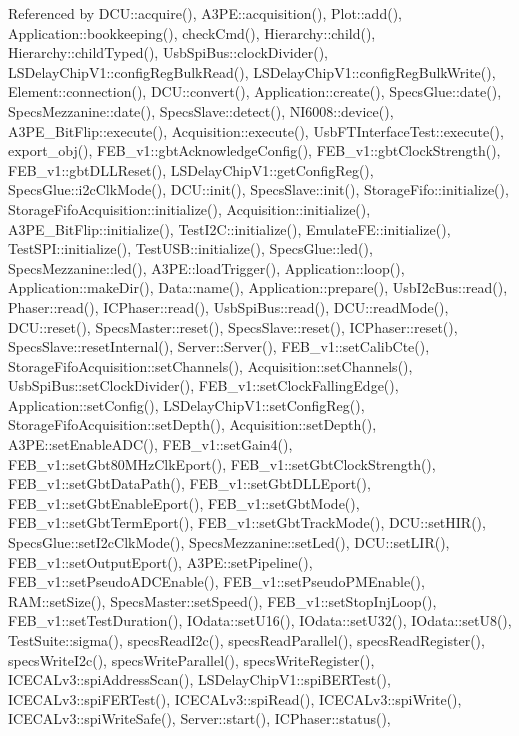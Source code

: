 Referenced by D\+C\+U\+::acquire(), A3\+P\+E\+::acquisition(), Plot\+::add(), Application\+::bookkeeping(), check\+Cmd(), Hierarchy\+::child(), Hierarchy\+::child\+Typed(), Usb\+Spi\+Bus\+::clock\+Divider(), L\+S\+Delay\+Chip\+V1\+::config\+Reg\+Bulk\+Read(), L\+S\+Delay\+Chip\+V1\+::config\+Reg\+Bulk\+Write(), Element\+::connection(), D\+C\+U\+::convert(), Application\+::create(), Specs\+Glue\+::date(), Specs\+Mezzanine\+::date(), Specs\+Slave\+::detect(), N\+I6008\+::device(), A3\+P\+E\+\_\+\+Bit\+Flip\+::execute(), Acquisition\+::execute(), Usb\+F\+T\+Interface\+Test\+::execute(), export\+\_\+obj(), F\+E\+B\+\_\+v1\+::gbt\+Acknowledge\+Config(), F\+E\+B\+\_\+v1\+::gbt\+Clock\+Strength(), F\+E\+B\+\_\+v1\+::gbt\+D\+L\+L\+Reset(), L\+S\+Delay\+Chip\+V1\+::get\+Config\+Reg(), Specs\+Glue\+::i2c\+Clk\+Mode(), D\+C\+U\+::init(), Specs\+Slave\+::init(), Storage\+Fifo\+::initialize(), Storage\+Fifo\+Acquisition\+::initialize(), Acquisition\+::initialize(), A3\+P\+E\+\_\+\+Bit\+Flip\+::initialize(), Test\+I2\+C\+::initialize(), Emulate\+F\+E\+::initialize(), Test\+S\+P\+I\+::initialize(), Test\+U\+S\+B\+::initialize(), Specs\+Glue\+::led(), Specs\+Mezzanine\+::led(), A3\+P\+E\+::load\+Trigger(), Application\+::loop(), Application\+::make\+Dir(), Data\+::name(), Application\+::prepare(), Usb\+I2c\+Bus\+::read(), Phaser\+::read(), I\+C\+Phaser\+::read(), Usb\+Spi\+Bus\+::read(), D\+C\+U\+::read\+Mode(), D\+C\+U\+::reset(), Specs\+Master\+::reset(), Specs\+Slave\+::reset(), I\+C\+Phaser\+::reset(), Specs\+Slave\+::reset\+Internal(), Server\+::\+Server(), F\+E\+B\+\_\+v1\+::set\+Calib\+Cte(), Storage\+Fifo\+Acquisition\+::set\+Channels(), Acquisition\+::set\+Channels(), Usb\+Spi\+Bus\+::set\+Clock\+Divider(), F\+E\+B\+\_\+v1\+::set\+Clock\+Falling\+Edge(), Application\+::set\+Config(), L\+S\+Delay\+Chip\+V1\+::set\+Config\+Reg(), Storage\+Fifo\+Acquisition\+::set\+Depth(), Acquisition\+::set\+Depth(), A3\+P\+E\+::set\+Enable\+A\+D\+C(), F\+E\+B\+\_\+v1\+::set\+Gain4(), F\+E\+B\+\_\+v1\+::set\+Gbt80\+M\+Hz\+Clk\+Eport(), F\+E\+B\+\_\+v1\+::set\+Gbt\+Clock\+Strength(), F\+E\+B\+\_\+v1\+::set\+Gbt\+Data\+Path(), F\+E\+B\+\_\+v1\+::set\+Gbt\+D\+L\+L\+Eport(), F\+E\+B\+\_\+v1\+::set\+Gbt\+Enable\+Eport(), F\+E\+B\+\_\+v1\+::set\+Gbt\+Mode(), F\+E\+B\+\_\+v1\+::set\+Gbt\+Term\+Eport(), F\+E\+B\+\_\+v1\+::set\+Gbt\+Track\+Mode(), D\+C\+U\+::set\+H\+I\+R(), Specs\+Glue\+::set\+I2c\+Clk\+Mode(), Specs\+Mezzanine\+::set\+Led(), D\+C\+U\+::set\+L\+I\+R(), F\+E\+B\+\_\+v1\+::set\+Output\+Eport(), A3\+P\+E\+::set\+Pipeline(), F\+E\+B\+\_\+v1\+::set\+Pseudo\+A\+D\+C\+Enable(), F\+E\+B\+\_\+v1\+::set\+Pseudo\+P\+M\+Enable(), R\+A\+M\+::set\+Size(), Specs\+Master\+::set\+Speed(), F\+E\+B\+\_\+v1\+::set\+Stop\+Inj\+Loop(), F\+E\+B\+\_\+v1\+::set\+Test\+Duration(), I\+Odata\+::set\+U16(), I\+Odata\+::set\+U32(), I\+Odata\+::set\+U8(), Test\+Suite\+::sigma(), specs\+Read\+I2c(), specs\+Read\+Parallel(), specs\+Read\+Register(), specs\+Write\+I2c(), specs\+Write\+Parallel(), specs\+Write\+Register(), I\+C\+E\+C\+A\+Lv3\+::spi\+Address\+Scan(), L\+S\+Delay\+Chip\+V1\+::spi\+B\+E\+R\+Test(), I\+C\+E\+C\+A\+Lv3\+::spi\+F\+E\+R\+Test(), I\+C\+E\+C\+A\+Lv3\+::spi\+Read(), I\+C\+E\+C\+A\+Lv3\+::spi\+Write(), I\+C\+E\+C\+A\+Lv3\+::spi\+Write\+Safe(), Server\+::start(), I\+C\+Phaser\+::status(), 
